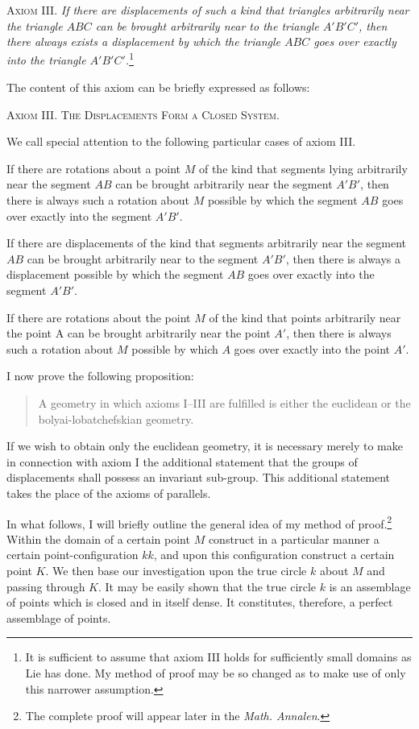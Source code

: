 \documentclass[11pt,oneside]{book}
\begin{document}
{\scshape Axiom III.} \textit{If there are displacements of such a
kind that triangles arbitrarily near the triangle
$ABC$ can be brought arbitrarily near to the triangle
$A'B'C'$, then there always exists a displacement
by which the triangle $ABC$ goes over exactly
into the triangle $A'B'C'$.}\footnote{It
is sufficient to assume that axiom III holds for sufficiently small domains
as Lie has done. My method of proof may be so changed as to make
use of only this narrower assumption.}

The content of this axiom can be briefly expressed
as follows:

{\scshape Axiom III\@. The Displacements Form a Closed System.}

We call special attention to the following particular
cases of axiom III.

If there are rotations about a point $M$ of the kind
that segments lying arbitrarily near the segment $AB$
can be brought arbitrarily near the segment $A'B'$, then
there is always such a rotation about $M$ possible by
which the segment $AB$ goes over exactly into the segment $A'B'$.

If there are displacements of the kind that segments
arbitrarily near the segment $AB$ can be brought
arbitrarily near to the segment $A'B'$, then there is
always a displacement possible by which the segment
$AB$ goes over exactly into the segment $A'B'$.

If there are rotations about the point $M$ of the
kind that points arbitrarily near the point A can be
brought arbitrarily near the point $A'$, then there is
always such a rotation about $M$ possible by which $A$
goes over exactly into the point $A'$.

I now prove the following proposition:

\begin{quote}
A geometry in which axioms I--III are fulfilled is
either the euclidean or the bolyai-lobatchefskian
geometry.
\end{quote}

If we wish to obtain only the euclidean geometry,
it is necessary merely to make in connection with
axiom I the additional statement that the groups of
displacements shall possess an invariant sub-group.
This additional statement takes the place of the axioms
of parallels.

In what follows, I will briefly outline the general
idea of my method of proof.\footnote{The
complete proof will appear later in the \textit{Math. Annalen}.}
Within the domain of a certain point $M$ construct
in a particular manner a certain point-configuration
$kk$, and upon this configuration construct a certain
point $K$. We then base our investigation upon the
true circle $k$ about $M$ and passing through $K$. It may
be easily shown that the true circle $k$ is an assemblage
of points which is closed and in itself dense. It constitutes,
therefore, a perfect assemblage of points.
\end{document}
